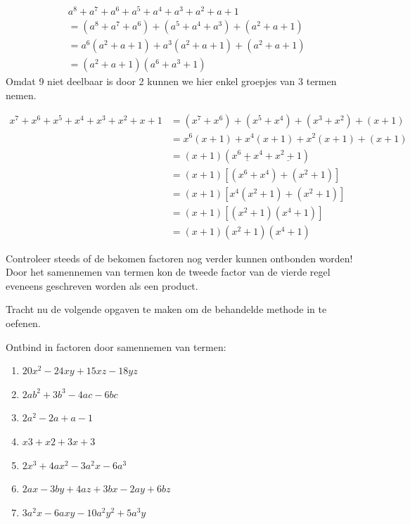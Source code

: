 \documentclass{bis}
\begin{document}
\begin{voorbeeld}
\begin{align*}
  & a^8 + a^7 + a^6 + a^5 + a^4 + a^3 + a^2 + a + 1\\
  &= (a^8 + a^7 +a^6) + (a^5 + a^4 + a^3) + (a^2 + a + 1)\\
  &= a^6 (a^2 + a + 1) + a^3 (a^2 + a + 1) + (a^2 + a + 1)\\
  &= (a^2 + a + 1) (a^6 + a^3 + 1)
\end{align*}
Omdat 9 niet deelbaar is door 2 kunnen we hier enkel groepjes van 3 termen nemen.
\end{voorbeeld}

\begin{voorbeeld}
\begin{align*}
x^7 + x^6 + x^5 + x^4 + x^3 + x^2 + x + 1
&= (x^7 + x^6) + (x^5 + x^4) + (x^3 + x^2) + (x + 1)\\
&= x^6 (x + 1) + x^4 (x + 1) + x^2 (x + 1) + (x + 1)\\
&= (x + 1) (\underline{x^6 + x^4} + \underline{x^2 + 1})\\
&= (x + 1) [(x^6 + x^4) + (x^2 + 1)]\\
&= (x + 1) [x^4(x^2 + 1) + (x^2 + 1)]\\
&= (x + 1) [(x^2 + 1) (x^4 + 1)]\\
&= (x + 1) (x^2 + 1) (x^4 + 1)
\end{align*}

Controleer steeds of de bekomen factoren nog verder kunnen ontbonden worden!
Door het samennemen van termen kon de tweede factor van de vierde regel eveneens geschreven worden als een product.
\end{voorbeeld}

Tracht nu de volgende opgaven te maken om de behandelde methode in te oefenen.

\begin{exercise}
Ontbind in factoren door samennemen van termen:
\begin{enumerate}
  \item $20x^2 - 24xy + 15xz - 18yz$
  \item $2ab^2 + 3b^3 - 4ac - 6bc$
  \item $2a^2 - 2a + a - 1$
  \item $x3 + x2 + 3x + 3$
  \item $2x^3 + 4ax^2 - 3a^2x - 6a^3$
  \item $2ax - 3by + 4az + 3bx - 2ay + 6bz$
  \item $3a^2x - 6axy - 10a^2y^2 + 5a^3y$
\end{enumerate}
\end{exercise}
\end{document}
